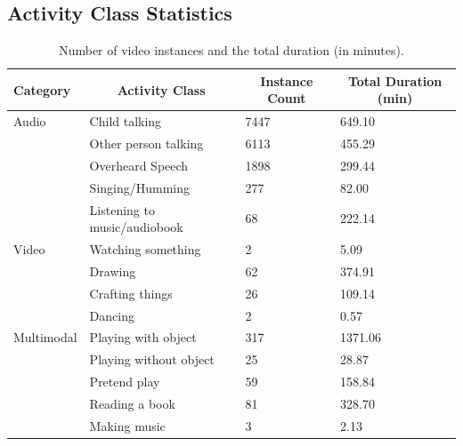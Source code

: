 \documentclass[
  man,floatsintext]{apa6}
\begin{document}
\subsection{Activity Class Statistics}\label{activity-class-statistics}

\begin{table}[tbp]

\begin{center}
\begin{threeparttable}

\caption{\label{tab:activity-classes-statistics}Number of video instances and the total duration (in minutes).}

\begin{tabular}{llll}
\toprule
Category & \multicolumn{1}{c}{Activity Class} & \multicolumn{1}{c}{Instance Count} & \multicolumn{1}{c}{Total Duration (min)}\\
\midrule
Audio & Child talking & 7447 & 649.10\\
 & Other person talking & 6113 & 455.29\\
 & Overheard Speech & 1898 & 299.44\\
 & Singing/Humming & 277 & 82.00\\
 & Listening to music/audiobook & 68 & 222.14\\
Video & Watching something & 2 & 5.09\\
 & Drawing & 62 & 374.91\\
 & Crafting things & 26 & 109.14\\
 & Dancing & 2 & 0.57\\
Multimodal & Playing with object & 317 & 1371.06\\
 & Playing without object & 25 & 28.87\\
 & Pretend play & 59 & 158.84\\
 & Reading a book & 81 & 328.70\\
 & Making music & 3 & 2.13\\
\bottomrule
\end{tabular}

\end{threeparttable}
\end{center}

\end{table}
\end{document}
